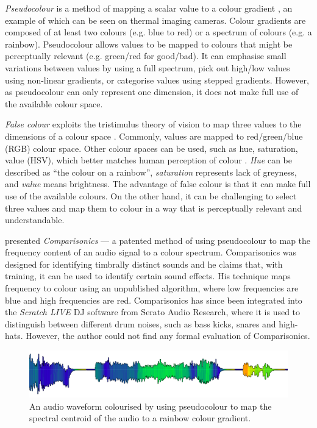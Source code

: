 \textit{Pseudocolour} is a method of mapping a scalar value to a colour gradient \citep{Moreland2009}, an example of
which can be seen on thermal imaging cameras.  Colour gradients are composed of at least two colours (e.g. blue to red)
or a spectrum of colours (e.g. a rainbow).  Pseudocolour allows values to be mapped to colours that might be
perceptually relevant (e.g. green/red for good/bad).  It can emphasise small variations between values by using a full
spectrum, pick out high/low values using non-linear gradients, or categorise values using stepped gradients.  However,
as pseudocolour can only represent one dimension, it does not make full use of the available colour space.

\textit{False colour} exploits the tristimulus theory of vision to map three values to the dimensions of a colour space
\citep{Moreland2009}. Commonly, values are mapped to red/green/blue (RGB) colour space. Other colour spaces can be
used, such as hue, saturation, value (HSV), which better matches human perception of colour \citep{Smith1978}.
\textit{Hue} can be described as ``the colour on a rainbow'', \textit{saturation} represents lack of greyness, and
\textit{value} means brightness. The advantage of false colour is that it can make full use of the available colours.
On the other hand, it can be challenging to select three values and map them to colour in a way that is perceptually
relevant and understandable.

\citet{Rice2005} presented \textit{Comparisonics} --- a patented \citep{Rice2001a} method of using pseudocolour to map
the frequency content of an audio signal to a colour spectrum.  Comparisonics was designed for identifying timbrally
distinct sounds and he claims that, with training, it can be used to identify certain sound effects.  His technique
maps frequency to colour using an unpublished algorithm, where low frequencies are blue and high frequencies are red.
Comparisonics has since been integrated into the \textit{Scratch LIVE} DJ software from Serato Audio Research, where it
is used to distinguish between different drum noises, such as bass kicks, snares and high-hats. However, the author
could not find any formal evaluation of Comparisonics.

\begin{figure}[t]
  \centering
  \includegraphics[width=\textwidth]{figs/freesound2.png}
  \caption{An audio waveform colourised by using pseudocolour to map the spectral centroid of the audio
  to a rainbow colour gradient.}
  \label{fig:pseudocolour-example}
\end{figure}

